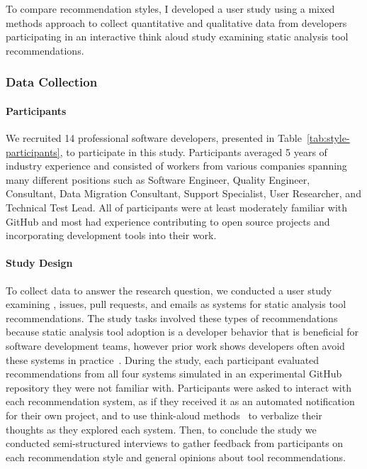 To compare recommendation styles, I developed a user study using a mixed methods approach to collect quantitative and qualitative data from developers participating in an interactive think aloud study examining static analysis tool recommendations.




\subsubsection{Data Collection}

\paragraph*{Participants}

We recruited 14 professional software developers, presented in Table~\ref{tab:style-participants}, to participate in this study. Participants averaged 5 years of industry experience and consisted of workers from various companies spanning many different positions such as Software Engineer, Quality Engineer, Consultant, Data Migration Consultant, Support Specialist, User Researcher, and Technical Test Lead. All of participants were at least moderately familiar with GitHub and most had experience contributing to open source projects and incorporating development tools into their work.

\paragraph*{Study Design}

To collect data to answer the research question, we conducted a user study examining \suggs, issues, pull requests, and emails as systems for static analysis tool recommendations. The study tasks involved these types of recommendations because static analysis tool adoption is a developer behavior that is beneficial for software development teams, however prior work shows developers often avoid these systems in practice~\cite{Johnson2013Why}. During the study, each participant evaluated recommendations from all four systems simulated in an experimental GitHub repository they were not familiar with. Participants were asked to interact with each recommendation system, as if they received it as an automated notification for their own project, and to use think-aloud methods~\cite{jaspers2004thinkaloud} to verbalize their thoughts as they explored each system. Then, to conclude the study we conducted semi-structured interviews to gather feedback from participants on each recommendation style and general opinions about tool recommendations.

